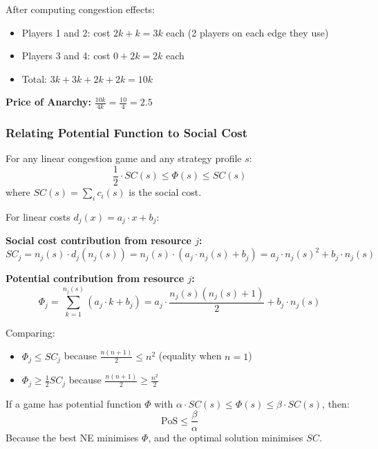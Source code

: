 \begin{exbox}[Tight PoA = 2.5 Example (4 Players)]
After computing congestion effects:
\begin{itemize}
  \item Players 1 and 2: cost $2k + k = 3k$ each (2 players on each edge they use)
  \item Players 3 and 4: cost $0 + 2k = 2k$ each
  \item Total: $3k + 3k + 2k + 2k = 10k$
\end{itemize}

\textbf{Price of Anarchy:} $\displaystyle\frac{10k}{4k} = \frac{10}{4} = 2.5$
\end{exbox}

\bigseparator

\subsubsection{Relating Potential Function to Social Cost}

\begin{thmbox}
For any linear congestion game and any strategy profile $s$:
\[
\frac{1}{2} \cdot SC(s) \leq \Phi(s) \leq SC(s)
\]
where $SC(s) = \sum_{i} c_i(s)$ is the social cost.
\end{thmbox}

\begin{thmbox}
For linear costs $d_j(x) = a_j \cdot x + b_j$:

\textbf{Social cost contribution from resource $j$:}
\[
SC_j = n_j(s) \cdot d_j(n_j(s)) = n_j(s) \cdot (a_j \cdot n_j(s) + b_j) = a_j \cdot n_j(s)^2 + b_j \cdot n_j(s)
\]

\textbf{Potential contribution from resource $j$:}
\[
\Phi_j = \sum_{k=1}^{n_j(s)} (a_j \cdot k + b_j) = a_j \cdot \frac{n_j(s)(n_j(s)+1)}{2} + b_j \cdot n_j(s)
\]

Comparing:
\begin{itemize}
  \item $\Phi_j \leq SC_j$ because $\frac{n(n+1)}{2} \leq n^2$ (equality when $n=1$)
  \item $\Phi_j \geq \frac{1}{2} SC_j$ because $\frac{n(n+1)}{2} \geq \frac{n^2}{2}$
\end{itemize}
\end{thmbox}

\begin{tipbox}
If a game has potential function $\Phi$ with $\alpha \cdot SC(s) \leq \Phi(s) \leq \beta \cdot SC(s)$, then:
\[
\text{PoS} \leq \frac{\beta}{\alpha}
\]
Because the best NE minimises $\Phi$, and the optimal solution minimises $SC$.
\end{tipbox}

